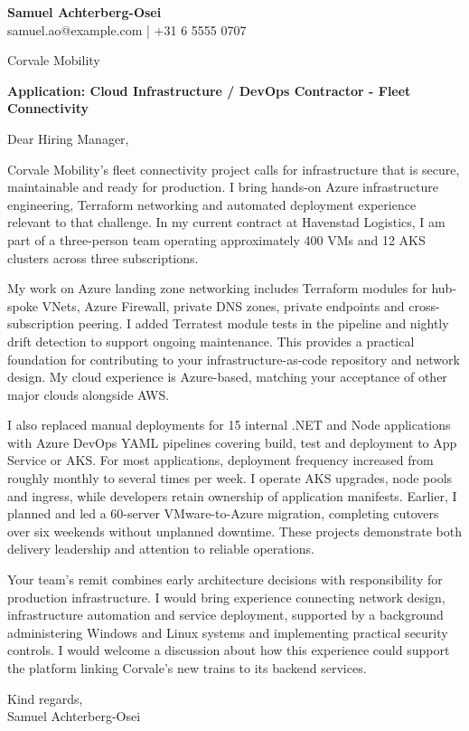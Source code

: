\documentclass[11pt,a4paper]{article}
\begin{document}
\textbf{\color{primarycolor}Samuel Achterberg-Osei}\\
samuel.ao@example.com | +31 6 5555 0707

Corvale Mobility

\textbf{Application: Cloud Infrastructure / DevOps Contractor - Fleet Connectivity}

Dear Hiring Manager,

Corvale Mobility's fleet connectivity project calls for infrastructure that is secure, maintainable and ready for production. I bring hands-on Azure infrastructure engineering, Terraform networking and automated deployment experience relevant to that challenge. In my current contract at Havenstad Logistics, I am part of a three-person team operating approximately 400 VMs and 12 AKS clusters across three subscriptions.

My work on Azure landing zone networking includes Terraform modules for hub-spoke VNets, Azure Firewall, private DNS zones, private endpoints and cross-subscription peering. I added Terratest module tests in the pipeline and nightly drift detection to support ongoing maintenance. This provides a practical foundation for contributing to your infrastructure-as-code repository and network design. My cloud experience is Azure-based, matching your acceptance of other major clouds alongside AWS.

I also replaced manual deployments for 15 internal .NET and Node applications with Azure DevOps YAML pipelines covering build, test and deployment to App Service or AKS. For most applications, deployment frequency increased from roughly monthly to several times per week. I operate AKS upgrades, node pools and ingress, while developers retain ownership of application manifests. Earlier, I planned and led a 60-server VMware-to-Azure migration, completing cutovers over six weekends without unplanned downtime. These projects demonstrate both delivery leadership and attention to reliable operations.

Your team's remit combines early architecture decisions with responsibility for production infrastructure. I would bring experience connecting network design, infrastructure automation and service deployment, supported by a background administering Windows and Linux systems and implementing practical security controls. I would welcome a discussion about how this experience could support the platform linking Corvale's new trains to its backend services.

Kind regards,\\
Samuel Achterberg-Osei
\end{document}
